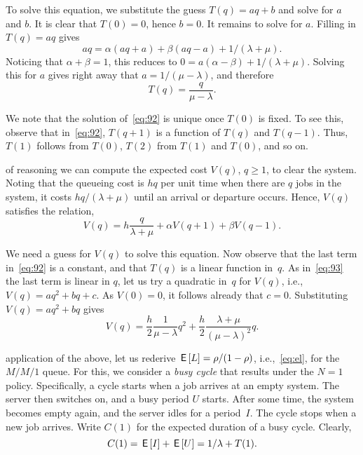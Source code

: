 To solve this equation, we substitute the guess $T(q) = aq+b$ and solve for $a$ and $b$.
It is clear that $T(0)=0$, hence $b=0$.
It remains to solve for $a$. Filling in $T(q)=aq$ gives
\begin{equation*}
  a q = \alpha (aq + a) + \beta (a q - a) + 1/(\lambda+\mu).
\end{equation*}
Noticing that $\alpha + \beta = 1$, this reduces to $0 = a(\alpha - \beta) + 1/(\lambda + \mu)$. Solving this for $a$ gives right away that $a = 1/(\mu-\lambda)$, and therefore
\begin{equation}
T(q) = \frac{q}{\mu-\lambda}.
\end{equation}

We note that the solution of~\cref{eq:92} is unique once $T(0)$ is fixed. To see this, observe that in~\cref{eq:92}, $T(q+1)$ is a function of $T(q)$ and $T(q-1)$. Thus, $T(1)$ follows from $T(0)$, $T(2)$ from $T(1)$ and $T(0)$, and so on.


 of reasoning we can compute the expected cost $V(q)$, $q\geq 1$, to clear the system.
Noting that the queueing cost is $hq$ per unit time when there are $q$ jobs in the system, it costs $hq/(\lambda+\mu)$ until an arrival or departure occurs.
Hence, $V(q)$ satisfies the relation,
\begin{equation}\label{eq:93}
  V(q) = h\frac{q}{\lambda + \mu} + \alpha V(q+1) + \beta V(q-1).
\end{equation}


We need a guess for $V(q)$ to solve this equation.
Now observe that the last term in~\cref{eq:92} is a constant, and that $T(q)$ is a linear function in~$q$.
As in~\cref{eq:93} the last term is linear in $q$,  let us try a quadratic in~$q$ for $V(q)$, i.e., $V(q)=a q^2 + b q + c$.
As $V(0)=0$, it follows already that $c=0$.
Substituting $V(q) = aq^2 + b q$ gives
\begin{equation*}
  V(q) = \frac h 2 \frac 1 {\mu -\lambda} q^2 + \frac h 2 \frac{\lambda + \mu}{(\mu - \lambda)^2}q.
\end{equation*}


 application of the above, let us rederive $\,\mathsf{E}\left[L\right] = \rho/(1-\rho)$, i.e.,~\cref{eq:el}, for the $M/M/1$ queue.
For this, we consider a \emph{busy cycle} that results under the $N=1$ policy.
Specifically, a cycle starts when a job arrives at an empty system.
The server then switches on, and a busy period $U$ starts.
After some time,
the system becomes empty again, and the server idles for a period~$I$.
The cycle stops when a new job arrives.
Write $C(1)$ for the expected duration of a busy cycle.
Clearly,
\begin{equation*}
C(1)=\,\mathsf{E}\left[I\right] + \,\mathsf{E}\left[U\right] = 1/\lambda + T(1).
\end{equation*}

